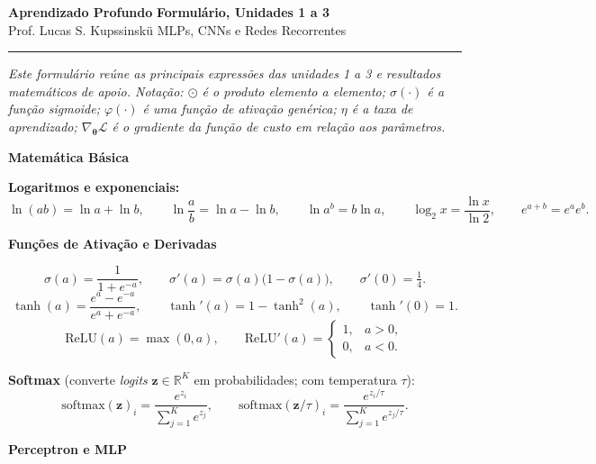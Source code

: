 \documentclass[11pt,a4paper]{article}
\newcommand{\thetav}{\boldsymbol{\theta}}
\newcommand{\bloco}[1]{%
  \par\vspace{0.3em}%
  {\bfseries\large #1}\par%
  \vspace{-0.4em}{\color{gray!60}\rule{\linewidth}{0.4pt}}\par%
}
\begin{document}
{\Large\bfseries Aprendizado Profundo} \hfill \textbf{Formulário, Unidades 1 a 3}\\
Prof. Lucas S. Kupssinskü \hfill MLPs, CNNs e Redes Recorrentes

\rule{\linewidth}{0.8pt}

\textit{Este formulário reúne as principais expressões das unidades 1 a 3 e resultados matemáticos de apoio. Notação: $\odot$ é o produto elemento a elemento; $\sigma(\cdot)$ é a função sigmoide; $\varphi(\cdot)$ é uma função de ativação genérica; $\eta$ é a taxa de aprendizado; $\nabla_{\thetav}\mathcal{L}$ é o gradiente da função de custo em relação aos parâmetros.}

\bloco{Matemática Básica}

\textbf{Logaritmos e exponenciais:}
\[
  \ln(ab) = \ln a + \ln b, \qquad
  \ln\frac{a}{b} = \ln a - \ln b, \qquad
  \ln a^{b} = b \ln a, \qquad
  \log_2 x = \frac{\ln x}{\ln 2}, \qquad
  e^{a+b} = e^{a} e^{b}.
\]

\bloco{Funções de Ativação e Derivadas}

\[
  \sigma(a) = \frac{1}{1 + e^{-a}}, \qquad
  \sigma'(a) = \sigma(a)\bigl(1 - \sigma(a)\bigr), \qquad
  \sigma'(0) = \tfrac{1}{4}.
\]
\[
  \tanh(a) = \frac{e^{a} - e^{-a}}{e^{a} + e^{-a}}, \qquad
  \tanh'(a) = 1 - \tanh^{2}(a), \qquad
  \tanh'(0) = 1.
\]
\[
  \mathrm{ReLU}(a) = \max(0, a), \qquad
  \mathrm{ReLU}'(a) =
  \begin{cases}
    1, & a > 0,\\
    0, & a < 0.
  \end{cases}
\]

\textbf{Softmax} (converte \textit{logits} $\mathbf{z} \in \mathbb{R}^{K}$ em probabilidades; com temperatura $\tau$):
\[
  \mathrm{softmax}(\mathbf{z})_i = \frac{e^{z_i}}{\sum_{j=1}^{K} e^{z_j}},
  \qquad
  \mathrm{softmax}(\mathbf{z}/\tau)_i = \frac{e^{z_i/\tau}}{\sum_{j=1}^{K} e^{z_j/\tau}}.
\]

\bloco{Perceptron e MLP}
\end{document}
